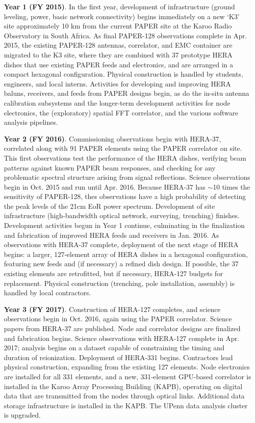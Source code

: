 \documentclass[preprint]{aastex}
\begin{document}
{\bf Year 1 (FY 2015)}.  In the first year, development of
infrastructure (ground leveling, power, basic network connectivity) begins
immediately on a new `K3' site approximately 10 km from the current PAPER site
at the Karoo Radio Observatory in South Africa.  As final PAPER-128
observations complete in Apr. 2015, the existing PAPER-128 antennas,
correlator, and EMC container are migrated to the K3 site, where they are
combined with 37 prototype HERA dishes that use existing PAPER feeds and
electronics, and are arranged in a compact hexagonal configuration.  Physical
construction is handled by students, engineers, and local interns.  Activities
for developing and improving HERA baluns, receivers, and feeds from PAPER
designs begin, as do the in-situ antenna calibration subsystems and the
longer-term development activities for node electronics, the (exploratory)
spatial FFT correlator, and the various software analysis pipelines.

{\bf Year 2 (FY 2016)}.  Commissioning observations begin with HERA-37,
correlated along with 91 PAPER elements using the PAPER correlator on site.
This first observations test the performance of the HERA dishes, verifying beam
patterns against known PAPER beam responses, and checking for any problematic
spectral structure arising from signal reflections.  Science observations begin
in Oct. 2015 and run until Apr. 2016.  Because HERA-37 has $\sim$10 times the sensitivity of
PAPER-128, thes observations have a high probability of
detecting the peak levels of the 21cm EoR power spectrum.   Development of site
infrastructure (high-bandwidth optical network, surveying, trenching) finishes.
Development activities begun in Year 1 continue, culminating in the
finalization and fabrication of improved HERA feeds and receivers in Jan.
2016.  As observations with HERA-37 complete, deployment of the next stage of
HERA begins: a larger, 127-element array of HERA dishes in a hexagonal
configuration, featuring new feeds and (if necessary) a refined dish design.
If possible, the 37 existing elements are retrofitted, but if necessary,
HERA-127 budgets for replacement.  Physical construction (trenching, pole
installation, assembly) is handled by local contractors.

{\bf Year 3 (FY 2017)}.  Construction of HERA-127 completes, and
science observations begin in Oct. 2016, again using the PAPER correlator.
Science papers from HERA-37 are published.   Node and correlator designs are
finalized and fabrication begins.  Science observations with HERA-127 complete
in Apr. 2017; analysis begins on a dataset capable of constraining the timing
and duration of reionization.  Deployment of HERA-331 begins.  Contractors lead
physical construction, expanding from the existing 127 elements.  Node
electronics are installed for all 331 elements, and a new, 331-element
GPU-based correlator is installed in the Karoo Array Processing Building
(KAPB), operating on digital data that are transmitted from the nodes through
optical links.  Additional data storage infrastructure is installed in the
KAPB.  The UPenn data analysis cluster is upgraded. 
\end{document}
